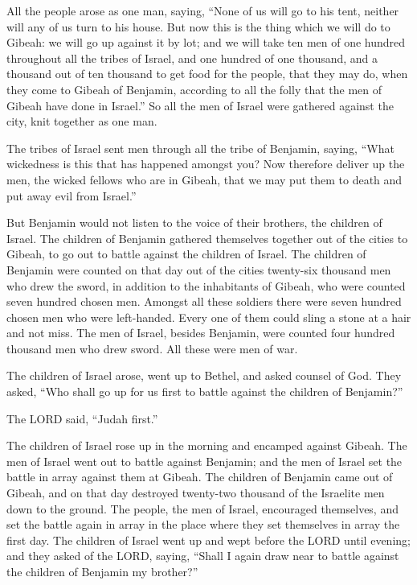  All the people arose as one man, saying, ``None of us will
go to his tent, neither will any of us turn to his house. 
But now this is the thing which we will do to Gibeah: we will go up
against it by lot;  and we will take ten men of one hundred
throughout all the tribes of Israel, and one hundred of one thousand,
and a thousand out of ten thousand to get food for the people, that they
may do, when they come to Gibeah of Benjamin, according to all the folly
that the men of Gibeah have done in Israel.''  So all the
men of Israel were gathered against the city, knit together as one man.

 The tribes of Israel sent men through all the tribe of
Benjamin, saying, ``What wickedness is this that has happened amongst
you?  Now therefore deliver up the men, the wicked fellows
who are in Gibeah, that we may put them to death and put away evil from
Israel.''

But Benjamin would not listen to the voice of their brothers, the
children of Israel.  The children of Benjamin gathered
themselves together out of the cities to Gibeah, to go out to battle
against the children of Israel.  The children of Benjamin
were counted on that day out of the cities twenty-six thousand men who
drew the sword, in addition to the inhabitants of Gibeah, who were
counted seven hundred chosen men.  Amongst all these
soldiers there were seven hundred chosen men who were left-handed. Every
one of them could sling a stone at a hair and not miss. 
The men of Israel, besides Benjamin, were counted four hundred thousand
men who drew sword. All these were men of war.

 The children of Israel arose, went up to Bethel, and asked
counsel of God. They asked, ``Who shall go up for us first to battle
against the children of Benjamin?''

The LORD said, ``Judah first.''

 The children of Israel rose up in the morning and encamped
against Gibeah.  The men of Israel went out to battle
against Benjamin; and the men of Israel set the battle in array against
them at Gibeah.  The children of Benjamin came out of
Gibeah, and on that day destroyed twenty-two thousand of the Israelite
men down to the ground.  The people, the men of Israel,
encouraged themselves, and set the battle again in array in the place
where they set themselves in array the first day.  The
children of Israel went up and wept before the LORD until evening; and
they asked of the LORD, saying, ``Shall I again draw near to battle
against the children of Benjamin my brother?''

